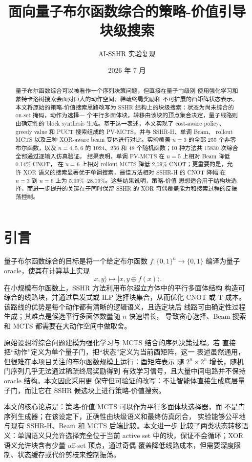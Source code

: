 \documentclass[11pt,letterpaper]{ctexart}
\title{面向量子布尔函数综合的策略-价值引导块级搜索}
\author{AI-SSHR 实验复现}
\date{2026 年 7 月}
\begin{document}
\maketitle

\begin{abstract}
量子布尔函数综合可以被看作一个序列决策问题，但直接在量子门级别
使用强化学习和蒙特卡洛树搜索会面对巨大的动作空间、稀疏终局奖励和
不可扩展的酉矩阵状态表示。本文将原始的策略-价值搜索思路改写为
SSHR 结构上的块级搜索：状态为尚未综合的 on-set 掩码，动作为选择一
个平行多面体块，转移由该块的顶点集合决定，量子线路则由确定性的
block synthesis 生成。基于这一表述，本文实现了 cost-aware policy、
greedy value 和 PUCT 搜索组成的 PV-MCTS，并与 SSHR-H、单调 Beam、
rollout MCTS 以及三种 XOR-aware beam 变体进行对比。实验覆盖
$n=3$ 的全部 255 个非零布尔函数，以及 $n=4,5,6$ 的 1024、256 和
48 个随机函数；10 种方法共 15830 次综合全部通过逐输入仿真验证。
结果表明，单调 PV-MCTS 在 $n=5$ 上相对 Beam 降低 0.14\% CNOT，
在 $n=6$ 上相对 rollout MCTS 降低 2.09\% CNOT；更重要的是，允许
XOR 语义的搜索显著优于单调搜索，最佳方法相对 SSHR-H 的 CNOT 降幅
在 $n=3$ 到 $n=6$ 上为 5.99\%--28.09\%。这些结果说明，策略-价值
思想适合用于结构块选择，而进一步提升的关键在于同时保留 SSHR 的
XOR 奇偶覆盖能力和搜索过程的反振荡控制。
\end{abstract}

\section{引言}

量子布尔函数综合的目标是将一个给定布尔函数 $f:\{0,1\}^n\to\{0,1\}$
编译为量子 oracle，使其在计算基上实现
\[
  |x,y\rangle \mapsto |x, y \oplus f(x)\rangle .
\]
在小规模布尔函数上，SSHR 方法利用布尔超立方体中的平行多面体结构
构造可综合的线路块，并通过启发式或 ILP 选择块集合，从而优化 CNOT
或 T 成本。该路线的优势是每个动作都有清晰的逻辑语义，且选定块后
线路可由确定性过程生成；其难点是候选平行多面体数量随 $n$ 快速增长，
导致贪心选择、Beam 搜索和 MCTS 都需要在大动作空间中做取舍。

原始设想将综合问题建模为强化学习与 MCTS 结合的序列决策过程。若
直接把“动作”定义为单个量子门，把“状态”定义为当前酉矩阵，这一
表述虽然通用，但很难在本项目关注的布尔函数规模上运行：酉矩阵表示
随 $2^n\times 2^n$ 增长，随机门序列几乎无法通过稀疏终局奖励得到
有效学习信号，且大量中间电路并不保持 oracle 结构。本文因此采用更
保守但可验证的改写：不让智能体直接生成底层量子门，而让它在 SSHR
候选块上进行策略-价值搜索。

本文的核心论点是：策略-价值 MCTS 可以作为平行多面体块选择器，而
不是门序列生成器；在该设定下，正确性由块级语义和最终仿真闭合，
实验能够公平地与现有 SSHR-H、Beam 和 MCTS 后端比较。本文进一步
比较了两类状态转移语义：单调语义只允许选择完全位于当前 active set
中的块，保证不会循环；XOR 语义允许块含有少量 off-set 顶点，通过奇偶
覆盖降低线路成本，但需要深度限制、状态缓存或代价剪枝来控制振荡。
\end{document}
